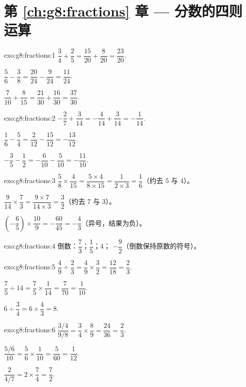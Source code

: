 \section*{第 \ref{ch:g8:fractions} 章 --- 分数的四则运算}

\begin{solution}{exo:g8:fractions:1}
$\dfrac34 + \dfrac25 = \dfrac{15}{20} + \dfrac{8}{20} =
\dfrac{23}{20}$.

$\dfrac56 - \dfrac38 = \dfrac{20}{24} - \dfrac{9}{24} =
\dfrac{11}{24}$.

$\dfrac{7}{10} + \dfrac{8}{15} = \dfrac{21}{30} + \dfrac{16}{30} =
\dfrac{37}{30}$.
\end{solution}

\begin{solution}{exo:g8:fractions:2}
$-\dfrac27 + \dfrac{3}{14} = -\dfrac{4}{14} + \dfrac{3}{14} =
-\dfrac{1}{14}$.

$\dfrac16 - \dfrac54 = \dfrac{2}{12} - \dfrac{15}{12} =
-\dfrac{13}{12}$.

$-\dfrac35 - \dfrac12 = -\dfrac{6}{10} - \dfrac{5}{10} =
-\dfrac{11}{10}$.
\end{solution}

\begin{solution}{exo:g8:fractions:3}
$\dfrac58 \times \dfrac{4}{15} = \dfrac{5 \times 4}{8 \times 15}
= \dfrac{1}{2 \times 3} = \dfrac16$（约去 $5$ 与 $4$）。

$\dfrac{9}{14} \times \dfrac73 = \dfrac{9 \times 7}{14 \times 3}
= \dfrac{3}{2}$（约去 $7$ 与 $3$）。

$\left(-\dfrac65\right) \times \dfrac{10}{9} = -\dfrac{60}{45}
= -\dfrac43$（异号，结果为负）。
\end{solution}

\begin{solution}{exo:g8:fractions:4}
倒数：$\dfrac73$；\quad $\dfrac15$；\quad $4$；\quad
$-\dfrac92$（倒数保持原数的符号）。
\end{solution}

\begin{solution}{exo:g8:fractions:5}
$\dfrac49 \div \dfrac23 = \dfrac49 \times \dfrac32 = \dfrac{12}{18}
= \dfrac23$.

$\dfrac75 \div 14 = \dfrac75 \times \dfrac{1}{14} = \dfrac{7}{70}
= \dfrac{1}{10}$.

$6 \div \dfrac34 = 6 \times \dfrac43 = 8$.
\end{solution}

\begin{solution}{exo:g8:fractions:6}
$\dfrac{3/4}{9/8} = \dfrac34 \times \dfrac89 = \dfrac{24}{36} =
\dfrac23$.

$\dfrac{5/6}{10} = \dfrac56 \times \dfrac{1}{10} = \dfrac{5}{60} =
\dfrac{1}{12}$.

$\dfrac{2}{4/7} = 2 \times \dfrac74 = \dfrac72$.
\end{solution}

